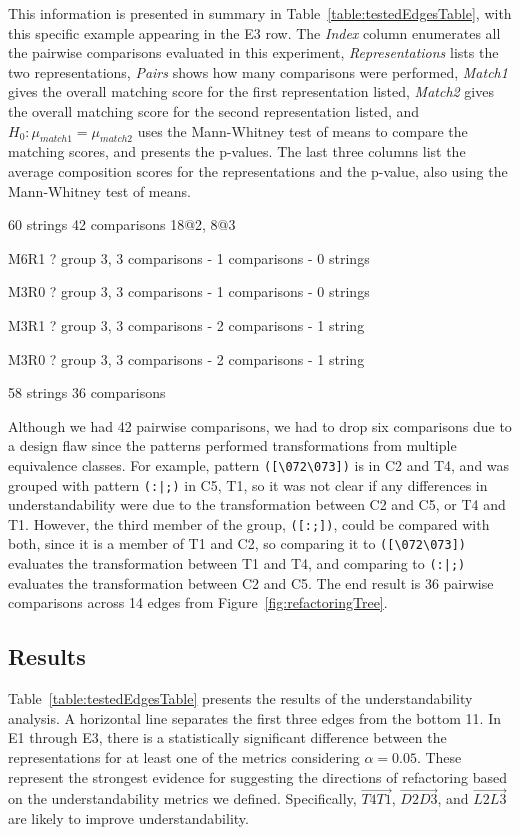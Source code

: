This information is presented in summary in Table~\ref{table:testedEdgesTable}, with this specific example appearing in the E3 row. The \emph{Index} column enumerates all the pairwise comparisons evaluated in this experiment, \emph{Representations} lists the two representations, \emph{Pairs} shows how many comparisons were performed, \emph{Match1} gives the overall matching score for the first representation listed, \emph{Match2} gives the overall matching score for the second representation listed, and $H_0: \mu_{match1} = \mu_{match2}$ uses the Mann-Whitney test of means to compare the matching scores, and presents the p-values. The last three columns list the average composition scores for the representations and the p-value, also using the Mann-Whitney test of means.

60 strings
42 comparisons
18@2, 8@3

M6R1 ? group 3, 3 comparisons
- 1 comparisons
- 0 strings

M3R0 ? group 3, 3 comparisons
- 1 comparisons
- 0 strings

M3R1 ? group 3, 3 comparisons
- 2 comparisons
- 1 string

M3R0 ? group 3, 3 comparisons
- 2 comparisons
- 1 string

58 strings
36 comparisons

Although we had 42 pairwise comparisons,  we had to drop six comparisons  due to a design flaw since the patterns performed transformations from multiple equivalence classes. For example, pattern \verb!([\072\073])! is in C2 and T4, and was grouped with pattern \verb!(:|;)! in C5, T1, so it was not clear if any differences in understandability were due to the transformation between C2 and C5, or T4 and T1. However, the third member of the group, \verb!([:;])!, could be compared with both, since it is a member of T1 and C2, so comparing it to \verb!([\072\073])! evaluates the transformation between T1 and T4, and comparing to \verb!(:|;)! evaluates the transformation between C2 and C5. The end result is 36 pairwise comparisons across 14 edges from Figure~\ref{fig:refactoringTree}.

\subsection{Results}
Table~\ref{table:testedEdgesTable} presents the results of the understandability analysis. A horizontal line separates the first three edges from the bottom 11. In E1 through E3, there is a statistically significant difference between the representations for at least one of the metrics considering $\alpha = 0.05$.  These represent the strongest evidence for suggesting the directions of refactoring based on the understandability metrics we defined. Specifically, $\overrightarrow{T4 T1}$, $\overrightarrow{D2 D3}$, and $\overrightarrow{L2 L3}$
are likely to improve understandability.

